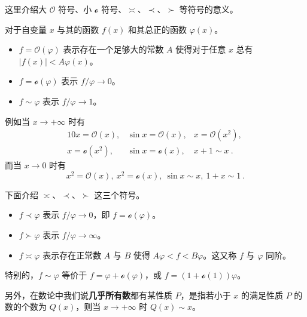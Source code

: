 
这里介绍大 $\mathcal O$ 符号、小 $\mathcal o$ 符号、$\asymp$、$\prec$、$\succ$ 等符号的意义。

对于自变量 $x$ 与其的函数 $f(x)$ 和其总正的函数 $\varphi(x)$。
\begin{itemize}
\item $f=\mathcal O(\varphi)$ 表示存在一个足够大的常数 $A$ 使得对于任意 $x$ 总有 $|f(x)| < A \varphi(x)$。
\item $f = \mathcal o(\varphi)$ 表示 $f/\varphi \rightarrow 0$。
\item $f \sim \varphi$ 表示 $f / \varphi \rightarrow 1$。
\end{itemize}

例如当 $x \rightarrow +\infty$ 时有
\begin{equation}
\begin{matrix}
10x = \mathcal O(x), &\sin x = \mathcal O(x), &x = \mathcal O(x^2), ~\\
x = \mathcal o(x^2), &\sin x = \mathcal o(x), &x + 1 \sim x ~.
\end{matrix}
\end{equation}
而当 $x \rightarrow 0$ 时有
\begin{equation}
x^2 = \mathcal O(x), ~ x^2 = \mathcal o(x), ~ \sin x \sim x , ~ 1+x \sim 1 ~.
\end{equation}

下面介绍 $\asymp$、$\prec$、$\succ$ 这三个符号。
\begin{itemize}
\item $f \prec \varphi$ 表示 $f/\varphi \rightarrow 0$，即 $f = \mathcal o(\varphi)$。
\item $f \succ \varphi$ 表示 $f/\varphi \rightarrow \infty$。
\item $f \asymp \varphi$ 表示存在正常数 $A$ 与 $B$ 使得 $A\varphi < f < B \varphi$。这又称 $f$ 与 $\varphi$ 同阶。
\end{itemize}

特别的，$f \sim \varphi$ 等价于 $f = \varphi + \mathcal o(\varphi)$，或 $f = (1 + \mathcal o(1))\varphi$。

另外，在数论中我们说\textbf{几乎所有数}都有某性质 $P$，是指若小于 $x$ 的满足性质 $P$ 的数的个数为 $Q(x)$，则当 $x \rightarrow +\infty$ 时 $Q(x) \sim x$。